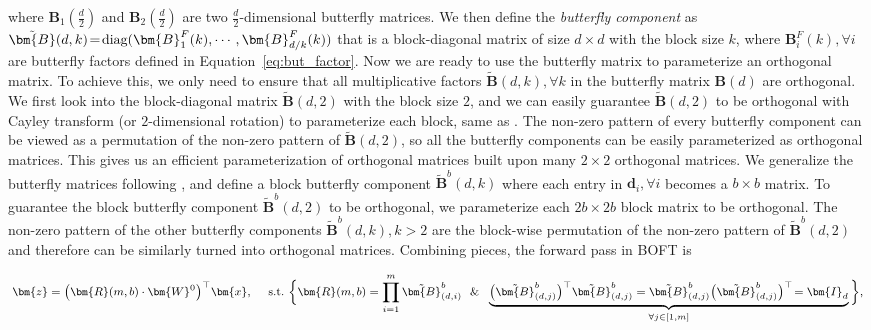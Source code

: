 where $\bm{B}_1(\frac{d}{2})$ and $\bm{B}_2(\frac{d}{2})$ are two $\frac{d}{2}$-dimensional butterfly matrices. We then define the \emph{butterfly component} as $\thickmuskip=2mu \medmuskip=2mu \tilde{\bm{B}}(d,k)=\text{diag}(\bm{B}^F_1(k),\cdots,\bm{B}^F_{d/k}(k))$ that is a block-diagonal matrix of size $d\times d$ with the block size $k$, where $\bm{B}^F_i(k),\forall i$ are butterfly factors defined in Equation~\ref{eq:but_factor}. Now we are ready to use the butterfly matrix to parameterize an orthogonal matrix. To achieve this, we only need to ensure that all multiplicative factors $\tilde{\bm{B}}(d,k),\forall k$ in the butterfly matrix $\bm{B}(d)$ are orthogonal. We first look into the block-diagonal matrix $\tilde{\bm{B}}(d,2)$ with the block size $2$, and we can easily guarantee $\tilde{\bm{B}}(d,2)$ to be orthogonal with Cayley transform (or $2$-dimensional rotation) to parameterize each block, same as \cite{liu2021orthogonal,qiu2023controlling}. The non-zero pattern of every butterfly component can be viewed as a permutation of the non-zero pattern of $\tilde{\bm{B}}(d,2)$, so all the butterfly components can be easily parameterized as orthogonal matrices. This gives us an efficient parameterization of orthogonal matrices built upon many $2\times 2$ orthogonal matrices. We generalize the butterfly matrices following \cite{chen2022pixelated}, and define a block butterfly component $\tilde{\bm{B}}^b(d,k)$ where each entry in $\bm{d}_i,\forall i$ becomes a $b\times b$ matrix. To guarantee the block butterfly component $\tilde{\bm{B}}^b(d,2)$ to be orthogonal, we parameterize each $2b\times 2b$ block matrix to be orthogonal. The non-zero pattern of the other butterfly components $\tilde{\bm{B}}^b(d,k),k>2$ are the block-wise permutation of the non-zero pattern of $\tilde{\bm{B}}^b(d,2)$ and therefore can be similarly turned into orthogonal matrices. Combining pieces, the forward pass in BOFT is

\vspace{-5.5mm}
\begin{equation}
    \footnotesize
    \begin{aligned}\nonumber
    \bm{z}=\big(\bm{R}(m,b)\cdot\bm{W}^0\big)^\top\bm{x},~~~~\text{s.t.}~\bigg{\{}\bm{R}(m,b)=\prod_{i=1}^m \tilde{\bm{B}}^b_{(d,i)}~~\&~~\underbrace{\big(\tilde{\bm{B}}^b_{(d,j)}\big)^\top\tilde{\bm{B}}^b_{(d,j)}=\tilde{\bm{B}}^b_{(d,j)}\big(\tilde{\bm{B}}^b_{(d,j)}\big)^\top\!=\bm{I}_d}_{\forall j\in [1, m]}\bigg{\}},
    \end{aligned}
\end{equation}
\vspace{-4mm}

